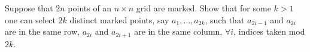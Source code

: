 Suppose that \(2n\) points of an \(n\times n\) grid are marked. Show that for some \(k > 1\) one can select \(2k\) distinct marked points, say \(a_1,\dots,a_{2k}\), such that \(a_{2i-1}\) and \(a_{2i}\) are in the same row, \(a_{2i}\) and \(a_{2i+1}\) are in the same column, \(\forall i\), indices taken mod \(2k\).